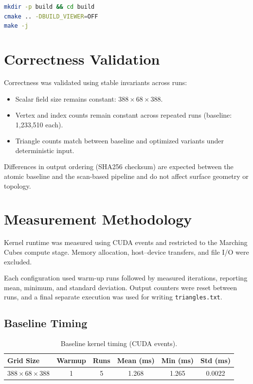 \documentclass[11pt,a4paper]{article}
\begin{document}
\begin{lstlisting}[language=bash]
mkdir -p build && cd build
cmake .. -DBUILD_VIEWER=OFF
make -j
\end{lstlisting}


\section{Correctness Validation}

Correctness was validated using stable invariants across runs:
\begin{itemize}
  \item Scalar field size remains constant: $388 \times 68 \times 388$.
  \item Vertex and index counts remain constant across repeated runs
        (baseline: 1,233,510 each).
  \item Triangle counts match between baseline and optimized variants under
        deterministic input.
\end{itemize}

Differences in output ordering (SHA256 checksum) are expected between the atomic baseline and the scan-based pipeline and do not affect surface geometry or topology.


\section{Measurement Methodology}

Kernel runtime was measured using CUDA events and restricted to the Marching Cubes compute stage. Memory allocation, host--device transfers, and file I/O were excluded.

Each configuration used warm-up runs followed by measured iterations, reporting mean, minimum, and standard deviation. Output counters were reset between runs, and a final separate execution was used for writing \texttt{triangles.txt}.

\subsection{Baseline Timing}

\begin{table}[H]
\centering
\caption{Baseline kernel timing (CUDA events).}
\label{tab:baseline_timing}
\begin{tabular}{lccccc}
\toprule
Grid Size & Warmup & Runs & Mean (ms) & Min (ms) & Std (ms) \\
\midrule
$388 \times 68 \times 388$ & 1 & 5 & 1.268 & 1.265 & 0.0022 \\
\bottomrule
\end{tabular}
\end{table}
\end{document}
